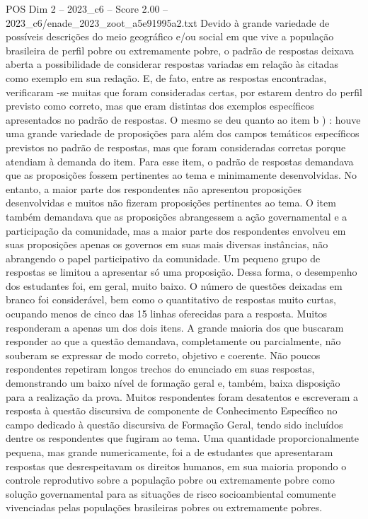 \begin{textsample}{POS Dim 2 – 2023\_c6 – Score 2.00 – 2023\_c6/enade\_2023\_zoot\_a5e91995a2.txt}
Devido à grande variedade de possíveis descrições do meio geográfico e/ou social em que vive a população brasileira de perfil pobre ou extremamente pobre, o padrão de respostas deixava aberta a possibilidade de considerar respostas variadas em relação às citadas como exemplo em sua redação.
E, de fato, entre as respostas encontradas, verificaram -se muitas que foram consideradas certas, por estarem dentro do perfil previsto como correto, mas que eram distintas dos exemplos específicos apresentados no padrão de respostas.
O mesmo se deu quanto ao item b ) : houve uma grande variedade de proposições para além dos campos temáticos específicos previstos no padrão de respostas, mas que foram consideradas corretas porque atendiam à demanda do item.
Para esse item, o padrão de respostas demandava que as proposições fossem pertinentes ao tema e minimamente desenvolvidas.
No entanto, a maior parte dos respondentes não apresentou proposições desenvolvidas e muitos não fizeram proposições pertinentes ao tema.
O item também demandava que as proposições abrangessem a ação governamental e a participação da comunidade, mas a maior parte dos respondentes envolveu em suas proposições apenas os governos em suas mais diversas instâncias, não abrangendo o papel participativo da comunidade.
Um pequeno grupo de respostas se limitou a apresentar só uma proposição.
Dessa forma, o desempenho dos estudantes foi, em geral, muito baixo.
O número de questões deixadas em branco foi considerável, bem como o quantitativo de respostas muito curtas, ocupando menos de cinco das 15 linhas oferecidas para a resposta.
Muitos responderam a apenas um dos dois itens.
A grande maioria dos que buscaram responder ao que a questão demandava, completamente ou parcialmente, não souberam se expressar de modo correto, objetivo e coerente.
Não poucos respondentes repetiram longos trechos do enunciado em suas respostas, demonstrando um baixo nível de formação geral e, também, baixa disposição para a realização da prova.
Muitos respondentes foram desatentos e escreveram a resposta à questão discursiva de componente de Conhecimento Específico no campo dedicado à questão discursiva de Formação Geral, tendo sido incluídos dentre os respondentes que fugiram ao tema.
Uma quantidade proporcionalmente pequena, mas grande numericamente, foi a de estudantes que apresentaram respostas que desrespeitavam os direitos humanos, em sua maioria propondo o controle reprodutivo sobre a população pobre ou extremamente pobre como solução governamental para as situações de risco socioambiental comumente vivenciadas pelas populações brasileiras pobres ou extremamente pobres.

\end{textsample}
